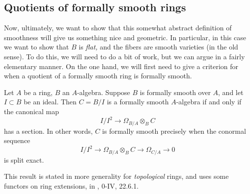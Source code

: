 \subsection{Quotients of formally smooth rings}

Now, ultimately, we want to show that this somewhat abstract definition of
smoothness will give us something nice and geometric. In particular, in this case we want to show
that $B$ is \emph{flat,} and the fibers are smooth varieties (in the old sense).
To do this, we will need to do a bit of work, but we can argue in a fairly
elementary manner. On the one hand, we will first need to give a criterion for when a
quotient of a formally smooth ring is formally smooth.



\begin{theorem}
\label{smoothconormal}
Let $A$ be a ring, $B$ an $A$-algebra. Suppose $B$ is formally smooth over $A$,
and let $I \subset B$ be an ideal. 
Then $C = B/I$ is a formally smooth $A$-algebra if and only if the canonical map
\[ I/I^2 \to \Omega_{B/A} \otimes_B C  \]
has a section.
In other words, $C$ is formally smooth precisely when the conormal sequence
\[  I/I^2 \to \Omega_{B/A} \otimes_B C \to \Omega_{C/A} \to 0 \]
is split exact.
\end{theorem} 

This result is stated in more generality  for \emph{topological} rings, and uses
some functors on ring extensions, in \cite{EGA}, 0-IV, 22.6.1. 

